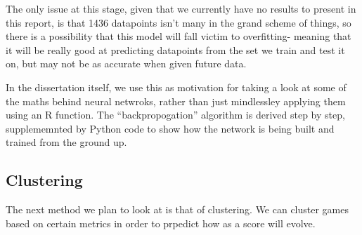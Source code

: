 \documentclass[11pt]{amsart}
\begin{document}
The only issue at this stage, given that we currently have no results to present in this report, is that 1436 datapoints isn't many in the grand scheme of things,
so there is a possibility that this model will fall victim to overfitting- meaning that it will be really good at predicting datapoints from the set we train and test it on,
but may not be as accurate when given future data. 

In the dissertation itself, we use this as motivation for taking a look at some of the maths behind neural netwroks, rather than just mindlessley applying them
using an R function. The ``backpropogation'' algorithm is derived step by step, supplememnted by Python code to show how the network is being built and trained from the ground up.

\subsection{Clustering}
The next method we plan to look at is that of clustering. We can cluster games based on certain metrics in order to prpedict how as a score will evolve.


{}

\end{document}
